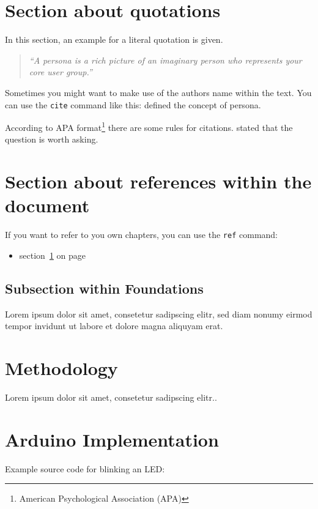 \documentclass[a4paper,12pt]{article}
\begin{document}
	\section{Section about quotations}
	\label{sec:section_about_quotations}
	
	In this section, an example for a literal quotation is given. 
	
	\begin{quotation}
		\emph{``A persona is a rich picture of an imaginary person who represents your core user group.''}
	\end{quotation}
	
	Sometimes you might want to make use of the authors name within the text. You can use the \texttt{cite} command like this: defined the concept of persona.
	
	According to APA format\footnote{American Psychological Association (APA)} there are some rules for citations. stated that the question is worth asking.
	
	\section{Section about references within the document}
	\label{sec:section_about_references_within_the_document}
	
	If you want to refer to you own chapters, you can use the \texttt{ref} command:
	\begin{itemize}
		\item section~\ref{sec:section_about_quotations} on page \pageref{sec:section_about_quotations}
	\end{itemize} 
	
	\subsection{Subsection within Foundations}
	Lorem ipsum dolor sit amet, consetetur sadipscing elitr, sed diam nonumy eirmod tempor invidunt ut labore et dolore magna aliquyam erat.
	
	\section{Methodology}
	\label{sec:methodology}
	Lorem ipsum dolor sit amet, consetetur sadipscing elitr..
	
	\section{Arduino Implementation}
	Example source code for blinking an LED:
	
\end{document}
